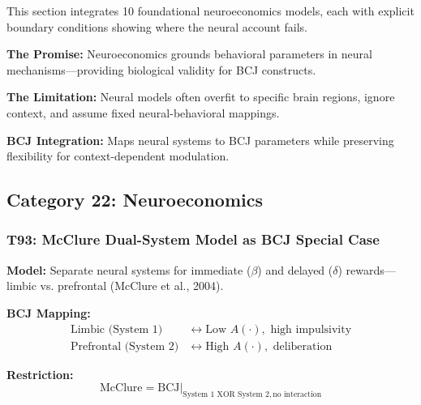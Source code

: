 This section integrates 10 foundational neuroeconomics models, each with explicit boundary conditions showing where the neural account fails.

\begin{tcolorbox}[colback=cyan!5!white, colframe=cyan!75!black,
    title=Why Neuroeconomics Matters for BCJ]
\textbf{The Promise:} Neuroeconomics grounds behavioral parameters in neural mechanisms---providing biological validity for BCJ constructs.

\textbf{The Limitation:} Neural models often overfit to specific brain regions, ignore context, and assume fixed neural-behavioral mappings.

\textbf{BCJ Integration:} Maps neural systems to BCJ parameters while preserving flexibility for context-dependent modulation.
\end{tcolorbox}


\subsection{Category 22: Neuroeconomics}

\subsubsection*{T93: McClure Dual-System Model as BCJ Special Case}

\textbf{Model:} Separate neural systems for immediate ($\beta$) and delayed ($\delta$) rewards---limbic vs. prefrontal (McClure et al., 2004).

\textbf{BCJ Mapping:}
\begin{align}
\text{Limbic (System 1)} &\leftrightarrow \text{Low } A(\cdot), \text{ high impulsivity} \\
\text{Prefrontal (System 2)} &\leftrightarrow \text{High } A(\cdot), \text{ deliberation}
\end{align}

\textbf{Restriction:}
\begin{equation}
\boxed{\text{McClure} = \text{BCJ} \big|_{\text{System 1 XOR System 2}, \, \text{no interaction}}}
\end{equation}

